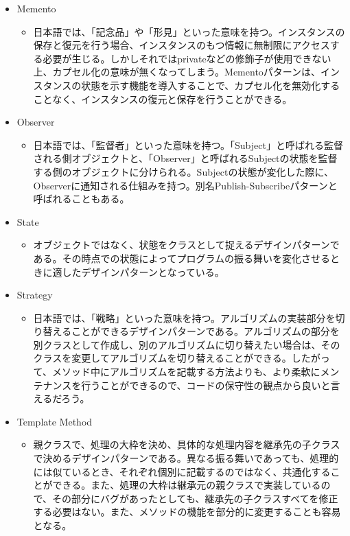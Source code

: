 \documentclass[dvipdfmx]{jsarticle}
\begin{document}
\begin{itemize}
  \item Memento
  \begin{itemize}
    \item 日本語では、「記念品」や「形見」といった意味を持つ。インスタンスの保存と復元を行う場合、インスタンスのもつ情報に無制限にアクセスする必要が生じる。しかしそれではprivateなどの修飾子が使用できない上、カプセル化の意味が無くなってしまう。Mementoパターンは、インスタンスの状態を示す機能を導入することで、カプセル化を無効化することなく、インスタンスの復元と保存を行うことができる。
  \end{itemize}
  \item Observer
  \begin{itemize}
    \item 日本語では、「監督者」といった意味を持つ。「Subject」と呼ばれる監督される側オブジェクトと、「Observer」と呼ばれるSubjectの状態を監督する側のオブジェクトに分けられる。Subjectの状態が変化した際に、Observerに通知される仕組みを持つ。別名Publish-Subscribeパターンと呼ばれることもある。
  \end{itemize}
  \item State
  \begin{itemize}
    \item オブジェクトではなく、状態をクラスとして捉えるデザインパターンである。その時点での状態によってプログラムの振る舞いを変化させるときに適したデザインパターンとなっている。
  \end{itemize}
  \item Strategy
  \begin{itemize}
    \item 日本語では、「戦略」といった意味を持つ。アルゴリズムの実装部分を切り替えることができるデザインパターンである。アルゴリズムの部分を別クラスとして作成し、別のアルゴリズムに切り替えたい場合は、そのクラスを変更してアルゴリズムを切り替えることができる。したがって、メソッド中にアルゴリズムを記載する方法よりも、より柔軟にメンテナンスを行うことができるので、コードの保守性の観点から良いと言えるだろう。
  \end{itemize}
  \item Template Method
  \begin{itemize}
    \item 親クラスで、処理の大枠を決め、具体的な処理内容を継承先の子クラスで決めるデザインパターンである。異なる振る舞いであっても、処理的には似ているとき、それぞれ個別に記載するのではなく、共通化することができる。また、処理の大枠は継承元の親クラスで実装しているので、その部分にバグがあったとしても、継承先の子クラスすべてを修正する必要はない。また、メソッドの機能を部分的に変更することも容易となる。

\end{itemize}
\end{itemize}
\end{document}
